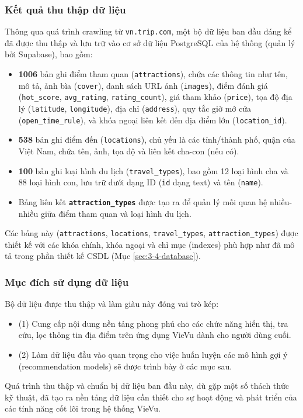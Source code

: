 \subsubsection{Kết quả thu thập dữ liệu}
Thông qua quá trình crawling từ \texttt{vn.trip.com}, một bộ dữ liệu ban đầu đáng kể đã được thu thập và lưu trữ vào cơ sở dữ liệu PostgreSQL của hệ thống (quản lý bởi Supabase), bao gồm:
\begin{itemize}
    \item \textbf{1006 } bản ghi điểm tham quan (\texttt{attractions}), chứa các thông tin như tên, mô tả, ảnh bìa (\texttt{cover}), danh sách URL ảnh (\texttt{images}), điểm đánh giá (\texttt{hot\_score}, \texttt{avg\_rating}, \texttt{rating\_count}), giá tham khảo (\texttt{price}), tọa độ địa lý (\texttt{latitude}, \texttt{longitude}), địa chỉ (\texttt{address}), quy tắc giờ mở cửa (\texttt{open\_time\_rule}), và khóa ngoại liên kết đến địa điểm lớn (\texttt{location\_id}).
    \item \textbf{538} bản ghi điểm đến (\texttt{locations}), chủ yếu là các tỉnh/thành phố, quận của Việt Nam, chứa tên, ảnh, tọa độ và liên kết cha-con (nếu có).
    \item \textbf{100} bản ghi loại hình du lịch (\texttt{travel\_types}), bao gồm 12 loại hình cha và 88 loại hình con, lưu trữ dưới dạng ID (\texttt{id} dạng text) và tên (\texttt{name}).
    \item Bảng liên kết \textbf{\texttt{attraction\_types}} được tạo ra để quản lý mối quan hệ nhiều-nhiều giữa điểm tham quan và loại hình du lịch.
\end{itemize}
Các bảng này (\texttt{attractions}, \texttt{locations}, \texttt{travel\_types}, \texttt{attraction\_types}) được thiết kế với các khóa chính, khóa ngoại và chỉ mục (indexes) phù hợp như đã mô tả trong phần thiết kế CSDL (Mục \ref{sec:3-4-database}).

\subsubsection{Mục đích sử dụng dữ liệu}
Bộ dữ liệu được thu thập và làm giàu này đóng vai trò kép: 
\begin{itemize}
    \item (1) Cung cấp nội dung nền tảng phong phú cho các chức năng hiển thị, tra cứu, lọc thông tin địa điểm trên ứng dụng VieVu dành cho người dùng cuối. 
    \item (2) Làm dữ liệu đầu vào quan trọng cho việc huấn luyện các mô hình gợi ý (recommendation models) sẽ được trình bày ở các mục sau.
\end{itemize}
Quá trình thu thập và chuẩn bị dữ liệu ban đầu này, dù gặp một số thách thức kỹ thuật, đã tạo ra nền tảng dữ liệu cần thiết cho sự hoạt động và phát triển của các tính năng cốt lõi trong hệ thống VieVu.
